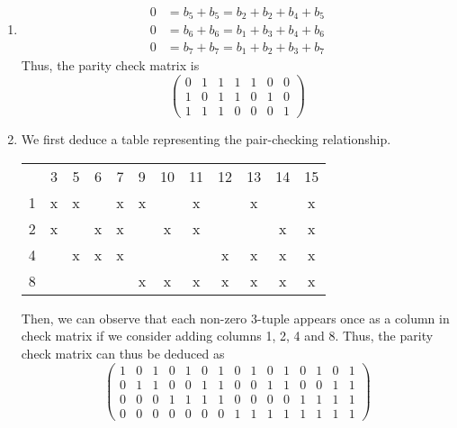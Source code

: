 \documentclass{article}
\begin{document}
\begin{enumerate}
    \item
    \begin{equation*}
        \begin{split}
            0&=b_5+b_5 = b_2+b_2+b_4+b_5\\
            0&=b_6+b_6 = b_1+b_3+b_4+b_6\\
            0&=b_7+b_7 = b_1+b_2+b_3+b_7
        \end{split}
    \end{equation*}
    Thus, the parity check matrix is 
    $$
    \begin{pmatrix}
        0 &1&1&1&1&0&0 \\
        1&0&1&1&0&1&0\\
        1&1&1&0&0&0&1
    \end{pmatrix}
    $$  
    
    \item
    We first deduce a table representing the pair-checking relationship.
    \begin{center}
        \begin{tabular}{c c c c c c c c c c c c }
    
             & 3 &5 &6&7&9&10&11&12&13&14&15\\
            1& x &x & &x&x& &x & &x& &x\\
            2&x & &x&x& &x&x && &x&x\\
            4& &x&x&x &&&&x&x&x&x\\
            8& & & & &x&x&x&x&x&x&x
            
        \end{tabular}        
    \end{center}
    Then, we can observe that each non-zero 3-tuple appears once as a column in check matrix if we consider adding columns 1, 2, 4 and 8.
    Thus, the parity check matrix can thus be deduced as 
    $$
    \begin{pmatrix}
        1 & 0&1&0&1&0&1&0&1&0&1&0&1&0&1\\
        0 &1&1 &0&0&1&1 &0  &0&1&1&0&0&1&1\\
        0 &0&0&1&1&1  &1  &0 &0&0&0&1&1&1&1\\
        0&0&0&0&0&0&0&1&1&1&1&1&1&1&1
        
    \end{pmatrix}
    $$
\end{enumerate}
\end{document}
